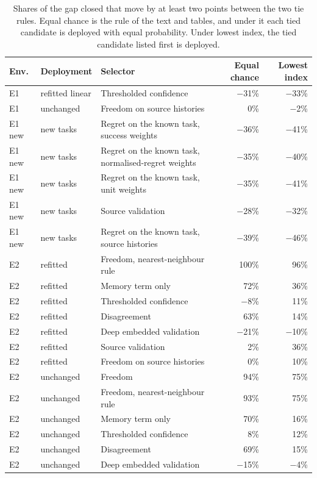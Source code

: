 \begin{table}[t]
\centering
\caption{Shares of the gap closed that move by at least two points between the two tie rules. Equal chance is the rule of the text and tables, and under it each tied candidate is deployed with equal probability. Under lowest index, the tied candidate listed first is deployed.}
\label{tab:ties}
\footnotesize
\begin{tabular}{@{}ll>{\raggedright\arraybackslash}p{6.4cm}rr@{}}
\toprule
Env. & Deployment & Selector & Equal chance & Lowest index \\
\midrule
E1 & refitted linear & Thresholded confidence & $-$31\% & $-$33\% \\
E1 & unchanged & Freedom on source histories & 0\% & $-$2\% \\
E1 new & new tasks & Regret on the known task, success weights & $-$36\% & $-$41\% \\
E1 new & new tasks & Regret on the known task, normalised-regret weights & $-$35\% & $-$40\% \\
E1 new & new tasks & Regret on the known task, unit weights & $-$35\% & $-$41\% \\
E1 new & new tasks & Source validation & $-$28\% & $-$32\% \\
E1 new & new tasks & Regret on the known task, source histories & $-$39\% & $-$46\% \\
E2 & refitted & Freedom, nearest-neighbour rule & 100\% & 96\% \\
E2 & refitted & Memory term only & 72\% & 36\% \\
E2 & refitted & Thresholded confidence & $-$8\% & 11\% \\
E2 & refitted & Disagreement & 63\% & 14\% \\
E2 & refitted & Deep embedded validation & $-$21\% & $-$10\% \\
E2 & refitted & Source validation & 2\% & 36\% \\
E2 & refitted & Freedom on source histories & 0\% & 10\% \\
E2 & unchanged & Freedom & 94\% & 75\% \\
E2 & unchanged & Freedom, nearest-neighbour rule & 93\% & 75\% \\
E2 & unchanged & Memory term only & 70\% & 16\% \\
E2 & unchanged & Thresholded confidence & 8\% & 12\% \\
E2 & unchanged & Disagreement & 69\% & 15\% \\
E2 & unchanged & Deep embedded validation & $-$15\% & $-$4\% \\

\end{tabular}
\end{table}
